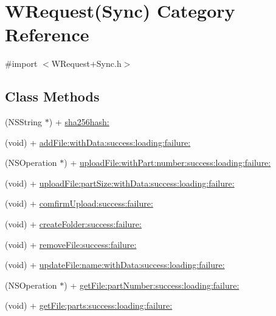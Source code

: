 \hypertarget{category_w_request_07_sync_08}{\section{W\-Request(Sync) Category Reference}
\label{category_w_request_07_sync_08}
}


{\ttfamily \#import $<$W\-Request+\-Sync.\-h$>$}

\subsection*{Class Methods}
\begin{DoxyCompactItemize}
\item 
(N\-S\-String $\ast$) + \hyperlink{category_w_request_07_sync_08_a8d50844ae308c8a072c93e7cc90dddf5}{sha256hash\-:}
\item 
(void) + \hyperlink{category_w_request_07_sync_08_aa269c4d286ffed82b8aa6948d5b3faaf}{add\-File\-:with\-Data\-:success\-:loading\-:failure\-:}
\item 
(N\-S\-Operation $\ast$) + \hyperlink{category_w_request_07_sync_08_a4a1398a9ef7ce9afcc3e02cdb85322c9}{upload\-File\-:with\-Part\-:number\-:success\-:loading\-:failure\-:}
\item 
(void) + \hyperlink{category_w_request_07_sync_08_ad103b9a44caafada269a1515488de693}{upload\-File\-:part\-Size\-:with\-Data\-:success\-:loading\-:failure\-:}
\item 
(void) + \hyperlink{category_w_request_07_sync_08_a9ab925f4aa518f084cf36d37795f1b23}{comfirm\-Upload\-:success\-:failure\-:}
\item 
(void) + \hyperlink{category_w_request_07_sync_08_a4ad4daa5d27da579425efb47515cd807}{create\-Folder\-:success\-:failure\-:}
\item 
(void) + \hyperlink{category_w_request_07_sync_08_a84de9f68ca5074a44141f5b8942bd03e}{remove\-File\-:success\-:failure\-:}
\item 
(void) + \hyperlink{category_w_request_07_sync_08_a76d4e0568f55ca784a4ee4ddd5b685c4}{update\-File\-:name\-:with\-Data\-:success\-:loading\-:failure\-:}
\item 
(N\-S\-Operation $\ast$) + \hyperlink{category_w_request_07_sync_08_a3630aff6c0169d1d2ffc783d333ce42d}{get\-File\-:part\-Number\-:success\-:loading\-:failure\-:}
\item 
(void) + \hyperlink{category_w_request_07_sync_08_acf6b8b63f4c6d4fbe8c29eebe0ccdd0c}{get\-File\-:parts\-:success\-:loading\-:failure\-:}
\end{DoxyCompactItemize}


